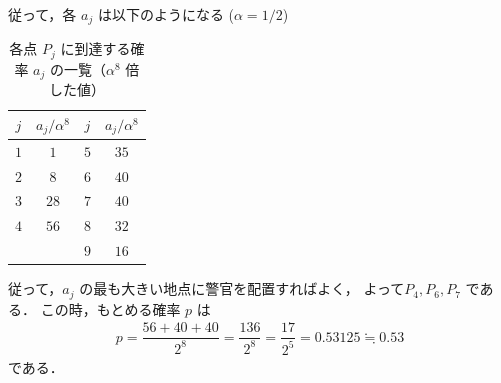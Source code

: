 \documentclass[../../main.tex]{subfiles}
\begin{document}
従って，各 $a_j$ は以下のようになる ($\alpha = 1/2$)

\begin{table}[htb]
  \centering
  \caption{各点 $P_j$ に到達する確率 $a_j$ の一覧（$\alpha^8$ 倍した値）}
  \begin{tabular}{c|c || c|c}
    $j$ & $a_j/\alpha^8$ & $j$ & $a_j/\alpha^8$ \\ \hline
    $1$ & $1$ & $5$ & $35$ \\
    $2$ & $8$ & $6$ & $40$ \\
    $3$ & $28$ & $7$ & $40$ \\
    $4$ & $56$ & $8$ & $32$ \\
    & & $9$ & $16$
  \end{tabular}
\end{table}

従って，$a_j$ の最も大きい地点に警官を配置すればよく，
よって$P_4, P_6, P_7$ である．
この時，もとめる確率 $p$ は
\begin{align}
  p = \dfrac{56+40+40}{2^8}
  = \dfrac{136}{2^8}
  = \dfrac{17}{2^5} = 0.53125 \fallingdotseq 0.53
\end{align}
である．
\end{document}
